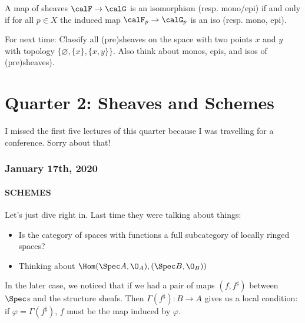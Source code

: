 \documentclass[12pt]{article}
\begin{document}
\begin{thm}[Basic]
	A map of sheaves $\calF\to \calG$ is an isomorphism (resp. mono/epi) if and only if for all $p\in X$ the induced map $\calF_p\to\calG_p$ is an iso (resp. mono, epi).
\end{thm}
\begin{prob}
	For next time: Classify all (pre)sheaves on the space with two points $x$ and $y$ with topology $\{\varnothing,\{x\},\{x,y\}\}$. Also think about monos, epis, and isos of (pre)sheaves).
\end{prob}

\part{Quarter 2: Sheaves and Schemes}
I missed the first five lectures of this quarter because I was travelling for a conference. Sorry about that!

\section{January 17th, 2020}
\subsection{SCHEMES}
Let's just dive right in. Last time they were talking about things:
\begin{itemize}
	\item Is the category of spaces with functions a full subcategory of locally ringed spaces?
	\item Thinking about $\Hom(\Spec A,\O_A),(\Spec B,\O_B))$
\end{itemize}
In the later case, we noticed that if we had a pair of maps $(f,f^\sharp)$ between $\Spec$s and the structure sheafs. Then $\Gamma(f^\sharp):B\to A$
gives us a local condition: if $\varphi=\Gamma(f^\sharp)$, $f$ must be the map induced by $\varphi$.
\end{document}
